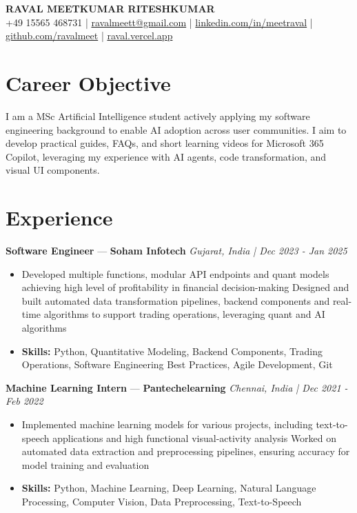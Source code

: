 \documentclass[a4paper,10pt]{article}
\begin{document}
\begin{center}
  {\Large\bfseries RAVAL MEETKUMAR RITESHKUMAR}\\[2pt]
  {\small +49 15565 468731 \;|\; \href{mailto:ravalmeett@gmail.com}{ravalmeett@gmail.com} \;|\; \href{https://www.linkedin.com/in/meetraval/}{linkedin.com/in/meetraval} \;|\; \href{https://github.com/ravalmeet}{github.com/ravalmeet} \;|\; \href{https://raval.vercel.app/}{raval.vercel.app}}
\end{center}
\vspace{-3pt}

\section*{Career Objective}
I am a MSc Artificial Intelligence student actively applying my software engineering background to enable AI adoption across user communities. I aim to develop practical guides, FAQs, and short learning videos for Microsoft 365 Copilot, leveraging my experience with AI agents, code transformation, and visual UI components.\par

\section*{Experience}
\textbf{Software Engineer} — \textbf{Soham Infotech} \hfill \textit{Gujarat, India \;|\; Dec 2023 - Jan 2025}\par
\vspace{1pt}
\begin{itemize}
  \item Developed multiple functions, modular API endpoints and quant models achieving high level of profitability in financial decision-making Designed and built automated data transformation pipelines, backend components and real-time algorithms to support trading operations, leveraging quant and AI algorithms
  \item \textbf{Skills:} Python, Quantitative Modeling, Backend Components, Trading Operations, Software Engineering Best Practices, Agile Development, Git
\end{itemize}
\vspace{3pt}
\textbf{Machine Learning Intern} — \textbf{Pantechelearning} \hfill \textit{Chennai, India \;|\; Dec 2021 - Feb 2022}\par
\vspace{1pt}
\begin{itemize}
  \item Implemented machine learning models for various projects, including text-to-speech applications and high functional visual-activity analysis Worked on automated data extraction and preprocessing pipelines, ensuring accuracy for model training and evaluation
  \item \textbf{Skills:} Python, Machine Learning, Deep Learning, Natural Language Processing, Computer Vision, Data Preprocessing, Text-to-Speech
\end{itemize}
\end{document}
